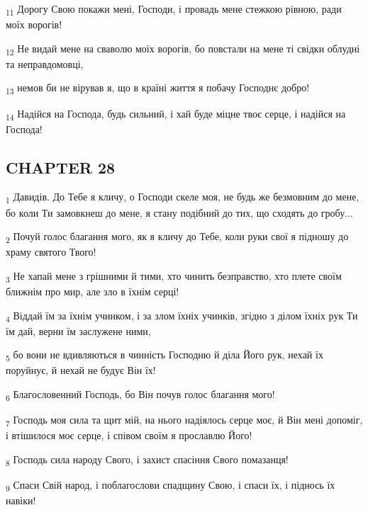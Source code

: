 \begin{tcolorbox}
\textsubscript{11} Дорогу Свою покажи мені, Господи, і провадь мене стежкою рівною, ради моїх ворогів!
\end{tcolorbox}
\begin{tcolorbox}
\textsubscript{12} Не видай мене на сваволю моїх ворогів, бо повстали на мене ті свідки облудні та неправдомовці,
\end{tcolorbox}
\begin{tcolorbox}
\textsubscript{13} немов би не вірував я, що в країні життя я побачу Господнє добро!
\end{tcolorbox}
\begin{tcolorbox}
\textsubscript{14} Надійся на Господа, будь сильний, і хай буде міцне твоє серце, і надійся на Господа!
\end{tcolorbox}
\subsection{CHAPTER 28}
\begin{tcolorbox}
\textsubscript{1} Давидів. До Тебе я кличу, о Господи скеле моя, не будь же безмовним до мене, бо коли Ти замовкнеш до мене, я стану подібний до тих, що сходять до гробу...
\end{tcolorbox}
\begin{tcolorbox}
\textsubscript{2} Почуй голос благання мого, як я кличу до Тебе, коли руки свої я підношу до храму святого Твого!
\end{tcolorbox}
\begin{tcolorbox}
\textsubscript{3} Не хапай мене з грішними й тими, хто чинить безправство, хто плете своїм ближнім про мир, але зло в їхнім серці!
\end{tcolorbox}
\begin{tcolorbox}
\textsubscript{4} Віддай їм за їхнім учинком, і за злом їхніх учинків, згідно з ділом їхніх рук Ти їм дай, верни їм заслужене ними,
\end{tcolorbox}
\begin{tcolorbox}
\textsubscript{5} бо вони не вдивляються в чинність Господню й діла Його рук, нехай їх поруйнує, й нехай не будує Він їх!
\end{tcolorbox}
\begin{tcolorbox}
\textsubscript{6} Благословенний Господь, бо Він почув голос благання мого!
\end{tcolorbox}
\begin{tcolorbox}
\textsubscript{7} Господь моя сила та щит мій, на нього надіялось серце моє, й Він мені допоміг, і втішилося моє серце, і співом своїм я прославлю Його!
\end{tcolorbox}
\begin{tcolorbox}
\textsubscript{8} Господь сила народу Свого, і захист спасіння Свого помазанця!
\end{tcolorbox}
\begin{tcolorbox}
\textsubscript{9} Спаси Свій народ, і поблагослови спадщину Свою, і спаси їх, і піднось їх навіки!
\end{tcolorbox}
